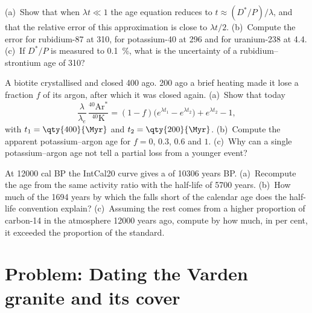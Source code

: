 \begin{exercise}[$\star\star\star$]\label{exo:b1:radiometric-methods:10}
(a)~Show that when $\lambda t \ll 1$ the age equation reduces to $t \approx
(D^*/P)/\lambda$, and that the relative error of this approximation is close to
$\lambda t/2$. (b)~Compute the error for rubidium-87 at \qty{310}{\Ma}, for
potassium-40 at \qty{296}{\Ma} and for uranium-238 at \qty{4.4}{\Ga}. (c)~If
$D^*/P$ is measured to \qty{0.1}{\percent}, what is the uncertainty of a
rubidium--strontium age of \qty{310}{\Ma}?
\end{exercise}

\begin{exercise}[$\star\star\star$]\label{exo:b1:radiometric-methods:11}
A biotite crystallised and closed \qty{400}{\Myr} ago. \qty{200}{\Myr} ago a
brief heating made it lose a fraction $f$ of its argon, after which it was closed
again. (a)~Show that today
\[
  \frac{\lambda}{\lambda_e}\,\frac{^{40}\mathrm{Ar}^*}{^{40}\mathrm{K}} =
  (1 - f)\bigl(e^{\lambda t_1} - e^{\lambda t_2}\bigr) + e^{\lambda t_2} - 1,
\]
with $t_1 = \qty{400}{\Myr}$ and $t_2 = \qty{200}{\Myr}$. (b)~Compute the
apparent potassium--argon age for $f = 0$, $0.3$, $0.6$ and $1$. (c)~Why can a
single potassium--argon age not tell a partial loss from a younger event?
\end{exercise}

\begin{exercise}[$\star\star\star$]\label{exo:b1:radiometric-methods:12}
At \num{12000} cal BP the IntCal20 curve gives a  of
\num{10306} years BP. (a)~Recompute the age from the same activity ratio with the
half-life of \num{5700} years. (b)~How much of the \num{1694} years by which the
 falls short of the calendar age does the half-life convention
explain? (c)~Assuming the rest comes from a higher proportion of carbon-14 in the
atmosphere \num{12000} years ago, compute by how much, in per cent, it exceeded
the proportion of the standard.
\end{exercise}

\section{Problem: Dating the Varden granite and its cover}

